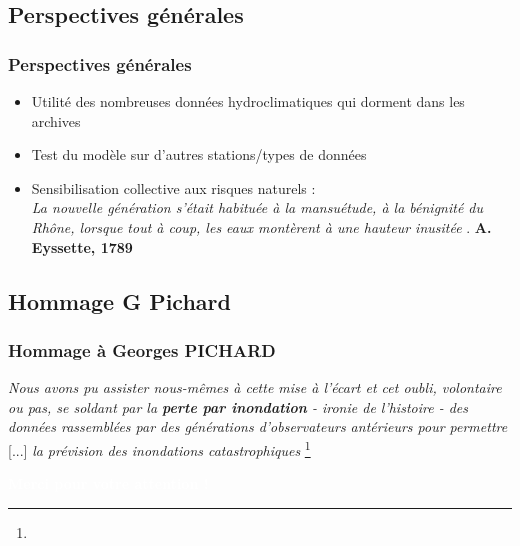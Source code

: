 \documentclass[compress,9pt]{beamer}
\renewcommand{\footfullcite}[1]{\footnote[frame]{\fullcite{#1}}}
\begin{document}
	\subsection{Perspectives générales}
	\begin{frame}
		\frametitle{Perspectives générales}
		\vfill
		\begin{itemize}
			\item<1->[$\vartriangleright$] Utilité des nombreuses données hydroclimatiques qui dorment dans les archives
			\vfill
			\item<2->[$\vartriangleright$] Test du modèle sur d'autres stations/types de données
			\vfill
			\item<3->[$\vartriangleright$] Sensibilisation collective aux risques naturels : \\ \og \textit{La nouvelle génération s'était habituée à la mansuétude, à la bénignité du Rhône, lorsque tout à coup, les eaux montèrent à une hauteur inusitée} \fg{}. \textbf{A. Eyssette, 1789}
				\end{itemize}
	\end{frame}
	
	\subsection{Hommage G Pichard}
	\begin{frame}
		\frametitle{Hommage à Georges PICHARD}
		\centering
		\og \textit{Nous avons pu assister nous-mêmes à cette mise à l'écart et cet oubli, volontaire ou pas, se soldant par la \textbf{perte par inondation} - ironie de l'histoire - des données rassemblées par des générations d'observateurs antérieurs pour permettre} [...] \textit{la prévision des inondations catastrophiques} \fg{} \footfullcite{pichard_sept_2014}
	\end{frame}
	
	{
    \begin{frame}
        \begin{center}
        	\vfill
        	\textcolor{white}{\Large \textbf{Merci pour votre attention !}}\\
		\vfill
        \end{center}
    \end{frame}
    }	
    



	\appendix
\end{document}
